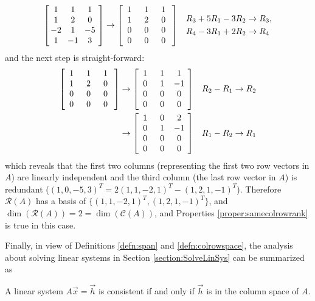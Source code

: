 \begin{solution}
\begin{align*}
\left[\begin{array}{@{\;}wc{10pt}wc{10pt}wc{10pt}wc{10pt}@{\;}}
1 & 1 & 1 \\
1 & 2 & 0 \\
-2 & 1 & -5 \\
1 & -1 & 3
\end{array}\right] 
&\rightarrow
\left[\begin{array}{@{\;}wc{10pt}wc{10pt}wc{10pt}wc{10pt}@{\;}}
1 & 1 & 1 \\
1 & 2 & 0 \\
0 & 0 & 0 \\
0 & 0 & 0
\end{array}\right] 
& \begin{aligned}
R_3 + 5R_1 - 3R_2 &\to R_3, \\
R_4 - 3R_1 + 2R_2 &\to R_4
\end{aligned}
\end{align*}
and the next step is straight-forward:
\begin{align*}
\left[\begin{array}{@{\;}wc{10pt}wc{10pt}wc{10pt}wc{10pt}@{\;}}
1 & 1 & 1 \\
1 & 2 & 0 \\
0 & 0 & 0 \\
0 & 0 & 0
\end{array}\right] 
&\rightarrow
\left[\begin{array}{@{\;}wc{10pt}wc{10pt}wc{10pt}wc{10pt}@{\;}}
1 & 1 & 1 \\
0 & 1 & -1 \\
0 & 0 & 0 \\
0 & 0 & 0
\end{array}\right] 
& R_2 - R_1 \to R_2 \\
&\rightarrow
\left[\begin{array}{@{\;}wc{10pt}wc{10pt}wc{10pt}wc{10pt}@{\;}}
1 & 0 & 2 \\
0 & 1 & -1 \\
0 & 0 & 0 \\
0 & 0 & 0
\end{array}\right] 
& R_1 - R_2 \to R_1
\end{align*}
which reveals that the first two columns (representing the first two row vectors in $A$) are linearly independent and the third column (the last row vector in $A$) is redundant ($(1,0,-5,3)^T = 2(1,1,-2,1)^T-(1,2,1,-1)^T$). Therefore $\mathcal{R}(A)$ has a basis of $\{(1,1,-2,1)^T, (1,2,1,-1)^T\}$, and $\dim(\mathcal{R}(A)) = 2 = \dim(\mathcal{C}(A))$, and Properties \ref{proper:samecolrowrank} is true in this case.
\end{solution}
Finally, in view of Definitions \ref{defn:span} and \ref{defn:colrowspace}, the analysis about solving linear systems in Section \ref{section:SolveLinSys} can be summarized as
\begin{proper}
A linear system $A\vec{x} = \vec{h}$ is consistent if and only if $\vec{h}$ is in the column space of $A$.
\end{proper}

